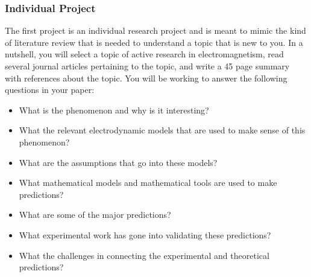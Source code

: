 \documentclass[letterpaper,10pt,english]{jupyterBook}
\begin{document}
\subsubsection{Individual Project}
\label{\detokenize{content/0_course/assessments:individual-project}}
\sphinxAtStartPar
The first project is an individual research project and is meant to mimic the kind of literature review that is needed to understand a topic that is new to you. In a nutshell, you will select a topic of active research in electromagnetism, read several journal articles pertaining to the topic, and write a 4\sphinxhyphen{}5 page summary with references about the topic. You will be working to answer the following questions in your paper:
\begin{itemize}
\item {} 
\sphinxAtStartPar
What is the phenomenon and why is it interesting?

\item {} 
\sphinxAtStartPar
What the relevant electrodynamic models that are used to make sense of this phenomenon?

\item {} 
\sphinxAtStartPar
What are the assumptions that go into these models?

\item {} 
\sphinxAtStartPar
What mathematical models and mathematical tools are used to make predictions?

\item {} 
\sphinxAtStartPar
What are some of the major predictions?

\item {} 
\sphinxAtStartPar
What experimental work has gone into validating these predictions?

\item {} 
\sphinxAtStartPar
What the challenges in connecting the experimental and theoretical predictions?

\end{itemize}
\end{document}
